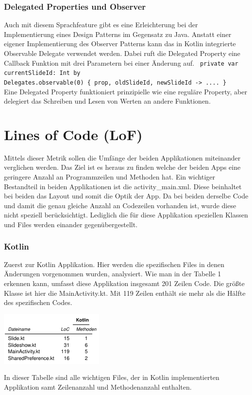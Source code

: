 \documentclass{sigchi-ext}
\begin{document}
\subsubsection{Delegated Properties und Observer}
Auch mit diesem Sprachfeature gibt es eine Erleichterung bei der Implementierung eines Design Patterns im Gegensatz zu Java. Anstatt einer eigener Implementierung des Observer Patterns kann das in Kotlin integrierte Observable Delegate verwendet werden. Dabei ruft die Delegated Property eine Callback Funktion mit drei Parametern bei einer Änderung auf. \ \texttt{private var currentSlideId: Int by \\Delegates.observable(0) \{ prop, oldSlideId, newSlideId -> .... \}} \\ Eine Delegated Property funktioniert prinzipielle wie eine reguläre Property, aber delegiert das Schreiben und Lesen von Werten an andere Funktionen. \cite{delegates}

\section{Lines of Code (LoF)}
Mittels dieser Metrik sollen die Umfänge der beiden Applikationen miteinander verglichen werden. Das Ziel ist es heraus zu finden welche der beiden Apps eine geringere Anzahl an Programmzeilen und Methoden hat. 
Ein wichtiger Bestandteil in beiden Applikationen ist die activity\_main.xml. Diese beinhaltet bei beiden das Layout und somit die Optik der App. Da bei beiden derselbe Code und damit die genau gleiche Anzahl an 
Codezeilen vorhanden ist, wurde diese nicht speziell berücksichtigt. Lediglich die für diese Applikation speziellen Klassen und Files werden einander gegenübergestellt.

\subsubsection{Kotlin}
Zuerst zur Kotlin Applikation. Hier werden die spezifischen Files in denen Änderungen vorgenommen wurden, analysiert. Wie man in der Tabelle 1 erkennen kann, umfasst diese Applikation insgesamt 201 Zeilen Code. Die größte Klasse ist hier die MainActivity.kt. Mit 119 Zeilen enthält sie mehr als die Hälfte des spezifischen Codes. 

\begin{marginfigure}[-40pc]
  \begin{minipage}{\marginparwidth}
    \centering
    \includegraphics[width=1.05\marginparwidth]{figures/Kotlin-Tabelle.png}
    \caption{In dieser Tabelle sind alle wichtigen Files, der in Kotlin implementierten Applikation samt Zeilenanzahl und Methodenanzahl enthalten.}
  \end{minipage}
\end{marginfigure}
\end{document}
